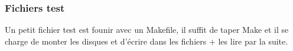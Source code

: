 \documentclass[10pt, onecolumn] {IEEEtran}
\begin{document}
\subsubsection{Fichiers test}

Un petit fichier test est founir avec un Makefile, il suffit de taper Make et il se charge de monter les disques et d'écrire dans les fichiers + les lire par la suite.
\end{document}
